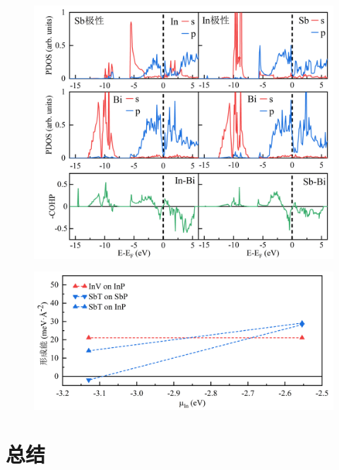\begin{figure}[htb]
    \includegraphics{pic/IS_DFT_PDOS-COHP.png}
\end{figure}

\begin{figure}[htb]
    \includegraphics{pic/IS_DFT_surfaceE_InVSbT.png}
\end{figure}
\section{总结}